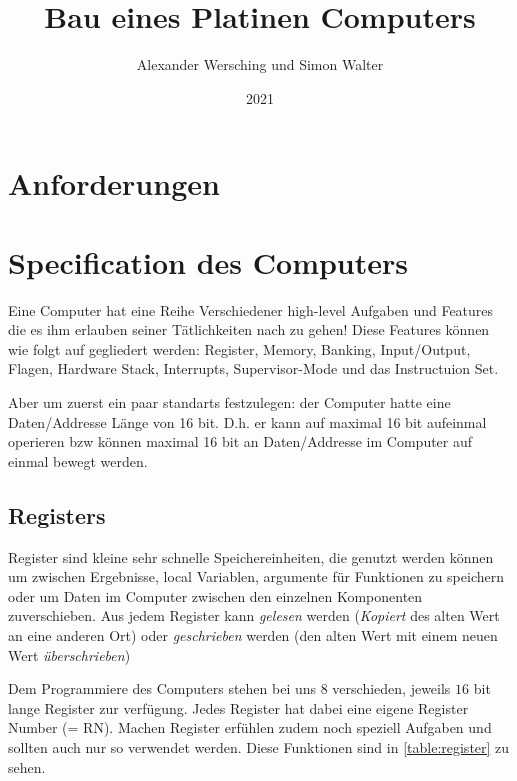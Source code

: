 \documentclass{scrartcl}
\begin{document}
\title{Bau eines Platinen Computers}
\author{Alexander Wersching und Simon Walter}
\date{2021}
\maketitle
\newpage


\tableofcontents
\newpage

\section{Anforderungen}

\section{Specification des Computers}
Eine Computer hat eine Reihe Verschiedener high-level Aufgaben und Features die es ihm erlauben seiner Tätlichkeiten nach zu gehen! 
Diese Features können wie folgt auf gegliedert werden: Register, Memory, Banking, Input/Output, Flagen, Hardware Stack, Interrupts, Supervisor-Mode und das Instructuion Set.

Aber um zuerst ein paar standarts festzulegen: der Computer hatte eine Daten/Addresse Länge von 16 bit. D.h. er kann auf 
maximal 16 bit aufeinmal operieren bzw können maximal 16 bit an Daten/Addresse im Computer auf einmal bewegt werden.

\subsection{Registers}
Register sind kleine sehr schnelle Speichereinheiten, die genutzt werden können um zwischen Ergebnisse, local Variablen, argumente für Funktionen zu speichern oder um Daten im Computer zwischen den einzelnen Komponenten zuverschieben. Aus jedem Register kann \emph{gelesen} werden (\emph{Kopiert} des alten Wert an eine anderen Ort) oder \emph{geschrieben} werden (den alten Wert mit einem neuen Wert \emph{überschrieben})

Dem Programmiere des Computers stehen bei uns $8$ verschieden, jeweils $16$ bit lange Register zur verfügung. Jedes Register hat dabei eine eigene Register Number (= RN). Machen Register erfühlen zudem noch speziell Aufgaben und sollten auch nur so verwendet werden. Diese Funktionen sind in \autoref{table:register} zu sehen.
\end{document}
